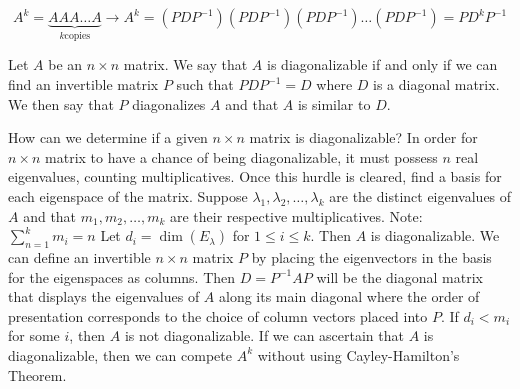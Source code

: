 \documentclass[12pt]{article}
\begin{document}
$$ A^k = \underbrace{AAA\dots A}_{k \text{copies}} \rightarrow A^k = (PDP^{-1})(PDP^{-1})(PDP^{-1})\dots(PDP^{-1}) = PD^kP^{-1} $$ 
\begin{definition} Let $A$ be an $n \times n$ matrix. We say that $A$ is diagonalizable if and only if we can find an invertible matrix $P$ such that $PDP^{-1} = D$ where $D$ is a diagonal matrix. We then say that $P$ diagonalizes $A$ and that $A$ is similar to $D$. \end{definition} 
How can we determine if a given $n \times n$ matrix is diagonalizable? \newline In order for $n \times n$ matrix to have a chance of being diagonalizable, it must possess $n$ real eigenvalues, counting multiplicatives. Once this hurdle is cleared, find a basis for each eigenspace of the matrix. Suppose $\lambda_1, \lambda_2, \dots, \lambda_k$ are the distinct eigenvalues of $A$ and that $m_1, m_2, \dots, m_k$ are their respective multiplicatives. \newline Note: $\sum_{n = 1}^k m_i = n$ \newline Let $d_i = \dim(E_\lambda)$ for $1 \leq i \leq k$. Then $A$ is diagonalizable. We can define an invertible $n \times n$ matrix $P$ by placing the eigenvectors in the basis for the eigenspaces as columns. Then $D = P^{-1}AP$ will be the diagonal matrix that displays the eigenvalues of $A$ along its main diagonal where the order of presentation corresponds to the choice of column vectors placed into $P$. \newline If $d_i < m_i$ for some $i$, then $A$ is not diagonalizable. If we can ascertain that $A$ is diagonalizable, then we can compete $A^k$ without using Cayley-Hamilton's Theorem. 
\end{document}
